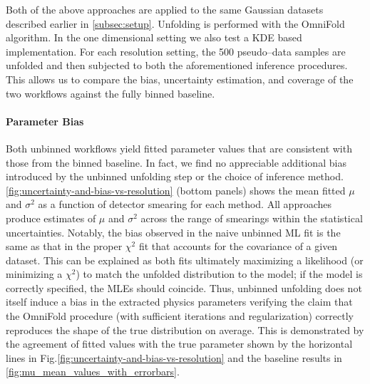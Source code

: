        Both of the above approaches are applied to the same Gaussian datasets described earlier in \cref{subsec:setup}.
        Unfolding is performed with the OmniFold algorithm.
        In the one dimensional setting we also test a KDE based implementation.
        For each resolution setting, the 500 pseudo--data samples are unfolded and then subjected to both the aforementioned inference procedures.
        This allows us to compare the bias, uncertainty estimation, and coverage of the two workflows against the fully binned baseline.
        \paragraph{Parameter Bias}
            Both unbinned workflows yield fitted parameter values that are consistent with those from the binned baseline.
            In fact, we find no appreciable additional bias introduced by the unbinned unfolding step or the choice of inference method.
            \cref{fig:uncertainty-and-bias-vs-resolution} (bottom panels) shows the mean fitted $\mu$ and $\sigma^2$ as a function of detector smearing for each method.
            All approaches produce estimates of $\mu$ and $\sigma^2$ across the range of smearings within the statistical uncertainties.
            Notably, the bias observed in the naive unbinned ML fit is the same as that in the proper $\chi^2$ fit that accounts for the covariance of a given dataset. 
            This can be explained as both fits ultimately maximizing a likelihood (or minimizing a $\chi^2$) to match the unfolded distribution to the model;
            if the model is correctly specified, the MLEs should coincide.
            Thus, unbinned unfolding does not itself induce a bias in the extracted physics parameters verifying the claim that the OmniFold procedure (with sufficient iterations and regularization) correctly reproduces the shape of the true distribution on average.
            This is demonstrated by the agreement of fitted values with the true parameter shown by the horizontal lines in Fig.\cref{fig:uncertainty-and-bias-vs-resolution} and the baseline results in \cref{fig:mu_mean_values_with_errorbars}. 
